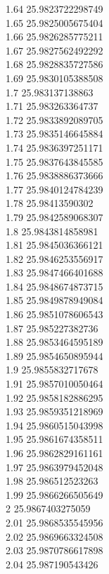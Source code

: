 {1.64	25.9823722298749\\
1.65	25.9825005675404\\
1.66	25.9826285775211\\
1.67	25.9827562492292\\
1.68	25.9828835727586\\
1.69	25.9830105388508\\
1.7	25.983137138863\\
1.71	25.983263364737\\
1.72	25.9833892089705\\
1.73	25.9835146645884\\
1.74	25.9836397251171\\
1.75	25.9837643845585\\
1.76	25.9838886373666\\
1.77	25.9840124784239\\
1.78	25.98413590302\\
1.79	25.9842589068307\\
1.8	25.9843814858981\\
1.81	25.9845036366121\\
1.82	25.9846253556917\\
1.83	25.9847466401688\\
1.84	25.9848674873715\\
1.85	25.9849878949084\\
1.86	25.9851078606543\\
1.87	25.985227382736\\
1.88	25.9853464595189\\
1.89	25.9854650895944\\
1.9	25.9855832717678\\
1.91	25.9857010050464\\
1.92	25.9858182886295\\
1.93	25.9859351218969\\
1.94	25.9860515043998\\
1.95	25.9861674358511\\
1.96	25.9862829161161\\
1.97	25.9863979452048\\
1.98	25.986512523263\\
1.99	25.9866266505649\\
2	25.9867403275059\\
2.01	25.9868535545956\\
2.02	25.9869663324508\\
2.03	25.9870786617898\\
2.04	25.987190543426\\
}
